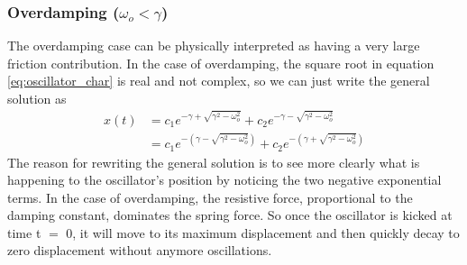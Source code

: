 \documentclass{article}
\newcommand{\be}{\begin{equation}}
\newcommand{\ee}{\end{equation}}
\begin{document}
\subsubsection*{Overdamping ($\omega_o < \gamma$)}
The overdamping case can be physically interpreted as having a very large friction contribution. 
In the case of overdamping, the square root in equation \ref{eq:oscillator_char} is real and not complex, so we can just write the general solution as
\be
\begin{split}
x(t) &= c_1 e^{-\gamma + \sqrt{\gamma^2 - \omega_o^2}} + c_2 e^{-\gamma - \sqrt{\gamma^2 - \omega_o^2}} \\
&= c_1 e^{-(\gamma - \sqrt{\gamma^2 - \omega_o^2})} + c_2 e^{-(\gamma + \sqrt{\gamma^2 - \omega_o^2})}
\end{split}
\ee
The reason for rewriting the general solution is to see more clearly what is happening to the oscillator's position by noticing the two negative exponential terms.
In the case of overdamping, the resistive force, proportional to the damping constant, dominates the spring force.
So once the oscillator is kicked at time t $=$ 0, it will move to its maximum displacement and then quickly decay to zero displacement without anymore oscillations.
\end{document}
